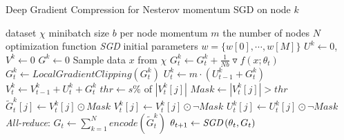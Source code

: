 \begin{minipage}[t]{.50\textwidth}
  \begin{algorithm}[H] \small
    \caption{{\small Deep Gradient Compression for Nesterov momentum SGD on node $k$}}
    \label{alg:snsgd}
    \begin{algorithmic}[1]
      \Require dataset $\chi$
      \Require minibatch size $b$ per node
      \Require momentum $m$
      \Require the number of nodes $N$
      \Require optimization function \emph{SGD}
      \Require initial parameters $w = \{w[0], \cdots, w[M]\}$
      \State $U^{k} \gets 0$, $V^{k} \gets 0$
      \State $G^{k} \gets 0$
      \State Sample data $x$ from $\chi$
      \State $G_{t}^{k} \gets G_{t}^{k} + \frac{1}{Nb} \triangledown f \left(x;\theta_{t} \right) $
      \EndFor
                \State $G_{t}^{k} \gets LocalGradientClipping(G_{t}^{k})$
                \EndIf
      \State $U_{t}^{k} \gets m \cdot \left(U_{t-1}^{k} + G_{t}^{k} \right)$
      \State $V_{t}^{k} \gets V_{t-1}^{k} + U_{t}^{k} + G_{t}^{k}$
      \State $thr \gets s\%$ of $\left|V_{t}^{k}[j]\right|$
      \State $ Mask \gets \left|V_{t}^{k}[j]\right| > thr$
      \State $\widetilde{G}_{t}^{k}[j] \gets V_{t}^{k}[j] \odot Mask$
      \State $V_{t}^{k}[j] \gets V_{t}^{k}[j] \odot \neg Mask$
                \State $U_{t}^{k}[j] \gets U_{t}^{k}[j] \odot \neg Mask$
      \EndFor
      \State \emph{All-reduce}: $G_{t} \gets \sum_{k=1}^{N} encode(\widetilde{G}_{t}^{k})$
      \State $\theta_{t+1} \gets \emph{SGD} \left(\theta_{t}, G_{t} \right)$
      \EndFor
    \end{algorithmic}
  \end{algorithm}
\end{minipage}
